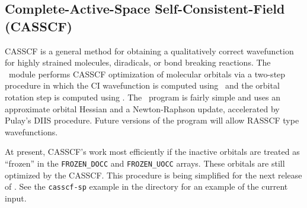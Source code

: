 \subsection{Complete-Active-Space Self-Consistent-Field (CASSCF)} \label{casscf}
                                                                                
CASSCF is a general method for obtaining a qualitatively correct
wavefunction for highly strained molecules, diradicals, or bond
breaking reactions.  The \PSIdetcasman\ module performs
CASSCF optimization of molecular orbitals via a two-step
procedure in which the CI wavefunction is computed using
\PSIdetci\, and the orbital rotation step is computed using
\PSIdetcas.  The \PSIdetcas\ program is fairly simple
and uses an approximate orbital Hessian and a Newton-Raphson update,
accelerated by Pulay's DIIS procedure.  Future versions of the
program will allow RASSCF type wavefunctions.

At present, CASSCF's work most efficiently if the inactive orbitals
are treated as ``frozen'' in the {\tt FROZEN\_DOCC} and {\tt FROZEN\_UOCC} 
arrays.  These orbitals are still optimized by the CASSCF.  This
procedure is being simplified for the next release of \PSIthree.
See the {\tt casscf-sp} example in the  directory for an
example of the current input.

